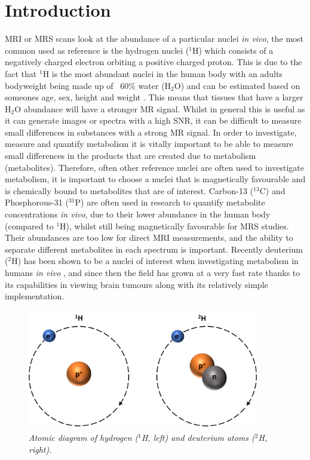 \chapter{Introduction}
\label{Chap:Introduction}

\Ac{MRI} or \ac{MRS} scans look at the abundance of a particular nuclei \textit{in vivo}, the most common used as reference is the hydrogen nuclei ($^1$H) which consists of a negatively charged electron orbiting a positive charged proton. This is due to the fact that $^1$H is the most abundant nuclei in the human body with an adults bodyweight being made up of ~60\% water (H$_2$O) and can be estimated based on someones age, sex, height and weight \cite{Watson1980TotalMeasurements}. This means that tissues that have a larger H$_2$O abundance will have a stronger MR signal. Whilst in general this is useful as it can generate images or spectra with a high \ac{SNR}, it can be difficult to measure small differences in substances with a strong MR signal. In order to investigate, measure and quantify metabolism it is vitally important to be able to measure small differences in the products that are created due to metabolism (metabolites). Therefore, often other reference nuclei are often used to investigate metabolism, it is important to choose a nuclei that is magnetically favourable and is chemically bound to metabolites that are of interest. Carbon-13 ($^{13}$C) \cite{Grist2019QuantifyingImaging,Brender2019DynamicHyperpolarization} and Phosphorous-31 ($^{31}$P) \cite{Gordon1980LocalizationResonance} are often used in research to quantify metabolite concentrations \textit{in vivo}, due to their lower abundance in the human body (compared to $^1$H), whilst still being magnetically favourable for MRS studies. Their abundances are too low for direct \ac{MRI} measurements, and the ability to separate different metabolites in each spectrum is important. Recently deuterium ($^2$H) has been shown to be a nuclei of interest when investigating metabolism in humans \textit{in vivo} \cite{Lu2017QuantitativeSpectroscopy,DeFeyter2018DeuteriumVivo}, and since then the field has grown at a very fast rate thanks to its capabilities in viewing brain tumours \cite{DeFeyter2018DeuteriumVivo} along with its relatively simple implementation.

\begin{figure}
    \centering
    \includegraphics[width=0.9\textwidth]{Figures/Intro/1H2H.png}
    \caption{\textit{Atomic diagram of hydrogen ($^1$H, left) and deuterium atoms ($^2$H, right).}}
    \label{fig:intro:1H2H}
\end{figure}

